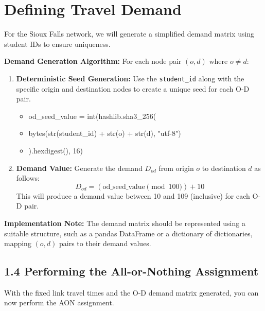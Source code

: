 \documentclass{rapportCS} %
\begin{document}
\newpage

\section{Defining Travel Demand}

For the Sioux Falls network, we will generate a simplified demand matrix using student IDs to ensure uniqueness.

\textbf{Demand Generation Algorithm:}
For each node pair \( (o, d) \) where \( o \neq d \):

\begin{enumerate}
    \item \textbf{Deterministic Seed Generation:} Use the \texttt{student\_id} along with the specific origin and destination nodes to create a unique seed for each O-D pair.
    \begin{itemize}
        \item od\_seed\_value = int(hashlib.sha3\_256(
        \item[] bytes(str(student\_id) + str(o) + str(d), "utf-8")
        \item[] ).hexdigest(), 16)
    \end{itemize}

    \item \textbf{Demand Value:} Generate the demand \( D_{od} \) from origin \( o \) to destination \( d \) as follows:
    $$ D_{od} = (\text{od\_seed\_value} \pmod{100}) + 10 $$
    This will produce a demand value between 10 and 109 (inclusive) for each O-D pair.
\end{enumerate}

\textbf{Implementation Note:} The demand matrix should be represented using a suitable structure, such as a pandas DataFrame or a dictionary of dictionaries, mapping \( (o, d) \) pairs to their demand values.

\newpage
\subsection*{1.4 Performing the All-or-Nothing Assignment}

With the fixed link travel times and the O-D demand matrix generated, you can now perform the AON assignment.
\end{document}
